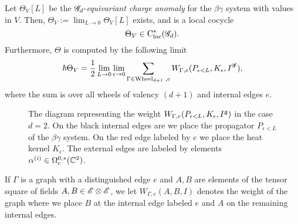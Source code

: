 \documentclass[10pt]{amsart}
\begin{document}
\begin{lem}\label{lem: obs}
Let $\Theta_V[L]$ be the $\mathscr G_d$-{\em equivariant charge anomaly} for the $\beta\gamma$ system with values in $V$.
Then, $\Theta_V := \lim_{L \to 0} \Theta_V[L]$ exists, and is a local cocycle 
\[
\Theta_V \in {\rm C}_{\rm loc}^*(\mathscr G_d) .
\]
Furthermore, $\Theta$ is computed by the following limit
\[
\hbar \Theta_V = \frac{1}{2} \lim_{L \to 0} \lim_{\epsilon \to 0} \sum_{\Gamma \in {\rm Wheel}_{d+1} \; , e} W_{\Gamma, e}(P_{\epsilon <L}, K_\epsilon, I^{\mathscr G}) ,
\] 
where the sum is over all wheels of valency $(d+1)$ and internal edges $e$. 
\end{lem}

\begin{figure}
\begin{center}
\caption{The diagram representing the weight $W_{\Gamma, e}(P_{\epsilon<L}, K_\epsilon, I^\mathfrak g)$ in the case $d=2$. 
On the black internal edges are we place the propagator $P_{\epsilon < L}$ of the $\beta\gamma$ system. 
On the red edge labeled by $e$ we place the heat kernel $K_\epsilon$.
The external edges are labeled by elements $\alpha^{(i)} \in \Omega^{0,*}_c(\mathbb C^2)$.}
\label{fig:liewheel}
\end{center}
\end{figure}

\begin{rmk}
If $\Gamma$ is a graph with a distinguished edge $e$ and $A,B$ are elements of the tensor square of fields $A, B \in \mathscr E \otimes \mathscr E$, we let $W_{\Gamma,e}(A,B, I)$ denotes the weight of the graph where we place $B$ at the internal edge labeled $e$ and $A$ on the remaining internal edges.
\end{rmk}
\end{document}
